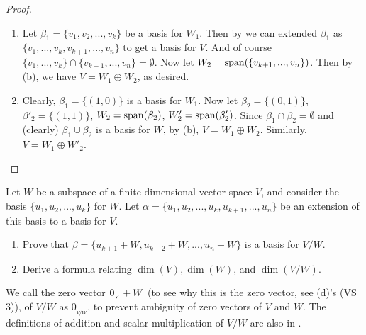 \begin{proof} \ 
\begin{enumerate}
\item Let \(\beta_1 = \{ v_1, v_2, ..., v_k \}\) be a basis for \(W_1\).
    Then by \CORO{1.11.1} we can extended \(\beta_1\) as \(\{v_1, ..., v_k, v_{k + 1}, ..., v_n \}\) to get a basis for \(V\).
    And of course \(\{ v_1, ..., v_k \} \cap \{ v_{k + 1}, ..., v_n \} = \emptyset\).
    Now let \(W_2 = \operatorname{span}(\{ v_{k + 1}, ..., v_n \})\).
    Then by (b), we have \(V = W_1 \oplus W_2\), as desired.
\item Clearly, \(\beta_1 = \{ (1, 0) \}\) is a basis for \(W_1\).
    Now let \(\beta_2 = \{ (0, 1) \}\), \(\beta'_2 = \{ (1, 1) \}\), \(W_2 = \operatorname{span}(\beta_2)\), \(W'_2 = \operatorname{span}(\beta'_2)\).
    Since \(\beta_1 \cap \beta_2 = \emptyset\) and (clearly) \(\beta_1 \cup \beta_2\) is a basis for \(W\), by \EXEC{1.6.33}(b), \(V = W_1 \oplus W_2\).
    Similarly, \(V = W_1 \oplus W'_2\).
\end{enumerate}
\end{proof}

\begin{exercise} \label{exercise 1.6.35}
Let \(W\) be a subspace of a finite-dimensional vector space \(V\), and consider the basis \(\{ u_1, u_2, ..., u_k \}\) for \(W\).
Let \(\alpha = \{ u_1, u_2, ..., u_k, u_{k + 1}, ..., u_n \}\) be an extension of this basis to a basis for \(V\).
\begin{enumerate}
\item Prove that \(\beta = \{ u_{k + 1} + W, u_{k + 2} + W, ..., u_n + W \}\) is a basis for \(V / W\).
\item Derive a formula relating \(\dim(V), \dim(W)\), and \(\dim(V/W)\).
\end{enumerate}
\end{exercise}

\begin{note}
We call the zero vector \(0_{_V} + W\) (to see why this is the zero vector, see (d)'s (VS 3)), of \(V/W\) as \(0_{_{V/W}}\), to prevent ambiguity of zero vectors of \(V\) and \(W\).
The definitions of addition and scalar multiplication of \(V/W\) are also in \EXEC{1.3.31}.
\end{note}

